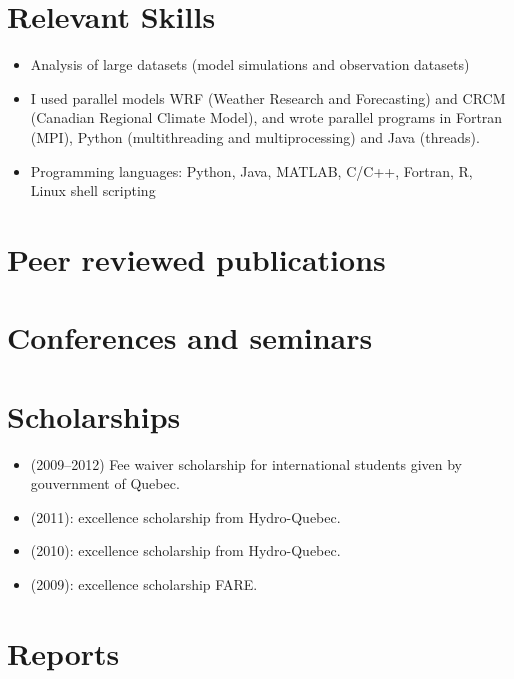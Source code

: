 \documentclass[12pt,a4paper,sans]{moderncv}
\newcommand{\vertspace}{1em}
\begin{document}
\section{Relevant Skills}
\vspace{\vertspace}
\begin{itemize}
  \item Analysis of large datasets (model simulations and observation datasets)

  \item I used parallel models WRF (Weather Research and Forecasting) and CRCM
  (Canadian Regional Climate Model), and wrote parallel programs in Fortran
  (MPI), Python (multithreading and multiprocessing) and Java (threads).

  \item Programming languages: Python, Java, MATLAB, C/C++, Fortran, R, Linux shell scripting

\end{itemize}


\section*{Peer reviewed publications}



\section*{Conferences and seminars}



\section{Scholarships}
\vspace{\vertspace}
\begin{itemize}
    \item (2009--2012) Fee waiver scholarship for international students given
    by gouvernment of Quebec.
    \item (2011): excellence scholarship from Hydro-Quebec.
    \item (2010): excellence scholarship from Hydro-Quebec.
    \item (2009): excellence scholarship FARE.
\end{itemize}


\section*{Reports}

\end{document}
